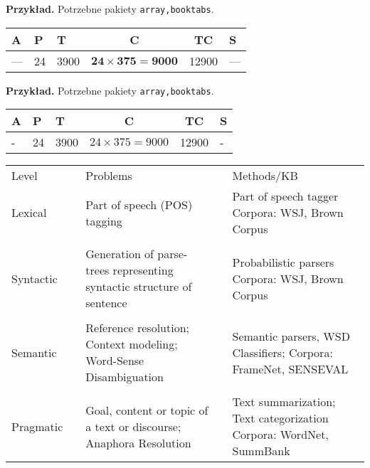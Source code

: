 \documentclass{article}
\begin{document}
\textbf{Przykład.} Potrzebne pakiety \verb|array,booktabs|.\\
\begin{center}
	\centering
	\small
	\begin{tabular}{p{0.7in}p{0.7in}p{1.3in}cc>{\centering\arraybackslash}p{1in}}\toprule
		\textbf{A} & \textbf{P} & \textbf{T} & \textbf{C} & \textbf{TC} & \textbf{S}\\ \midrule
		--- & 24 & 3900 & $\boldsymbol{24\times 375=9000}$ & 12900 & --- \\ \bottomrule
	\end{tabular}
\end{center}



\textbf{Przykład.} Potrzebne pakiety \verb|array,booktabs|.\\
\begin{center}
	\centering
	\small
	\begin{tabular}{p{0.7in}p{0.7in}p{1.3in}cc>{\centering}p{1in}}
		\toprule 
		\textbf{A} & \textbf{P} & \textbf{T} & \textbf{C} & \textbf{TC} & \textbf{S}\tabularnewline \midrule
		- & 24 & 3900 & $24\times 375=9000$ & 12900 & -\tabularnewline \bottomrule
	\end{tabular}
\end{center}


\begin{center}
		\begin{tabular}{l p{.5cm} p{4cm} p{.5cm} l}
			\hline\noalign{\smallskip}
			Level & & Problems & & Methods/KB \\
			\noalign{\smallskip} 
			\hline
			\noalign{\smallskip} 
			Lexical
			& &
			Part of speech (POS) tagging
			& &
			\parbox[t]{5cm}{
				\raggedright
				Part of speech tagger\break
				Corpora: WSJ, Brown Corpus\\
			}
			\\ \\
			Syntactic
			& &
			Generation of parse-trees representing syntactic structure of
			sentence
			& &
			\parbox[t]{5cm}{
				\raggedright
				Probabilistic parsers\break
				Corpora: WSJ, Brown Corpus\\
			}				
			\\ \\
			Semantic
			& &
			Reference resolution; Context modeling; Word-Sense Disambiguation
			& &
			\parbox[t]{5cm}{
				\raggedright
				Semantic parsers, WSD Classifiers;\break
				Corpora: FrameNet, SENSEVAL\\
			}
			\\ \\
			Pragmatic
			& &
			Goal, content or topic of a text or discourse; Anaphora Resolution
			& &
			\parbox[t]{5cm}{
				\raggedright
				Text summarization;\break
				Text categorization\break
				Corpora: WordNet, SummBank
			}
			\\
			\hline
		\end{tabular}
	\end{center}
\end{document}
